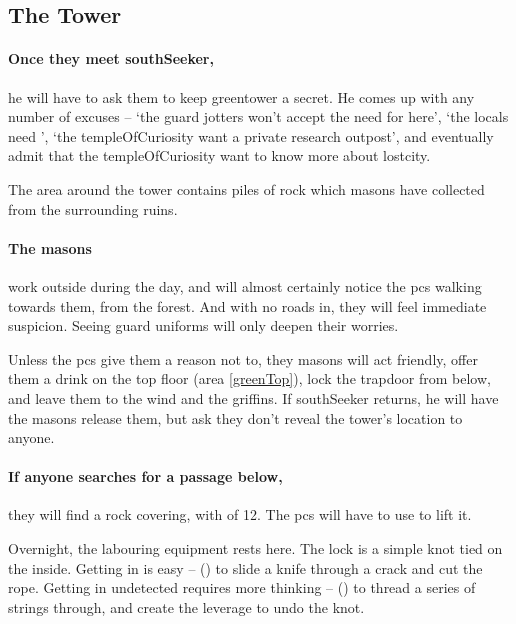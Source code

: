 \begin{multicols}{2}
\subsection{The Tower}

\paragraph{Once they meet \gls{southSeeker},}
he will have to ask them to keep \gls{greentower} a secret.
He comes up with any number of excuses -- `the \gls{guard} \glspl{jotter} won't accept the need for  here', `the locals need ', `the \gls{templeOfCuriosity} want a private research outpost', and eventually admit that the \gls{templeOfCuriosity} want to know more about \gls{lostcity}.


The area around the tower contains piles of rock which masons have collected from the surrounding ruins.

\paragraph{The masons}
work outside during the day, and will almost certainly notice the \glspl{pc} walking towards them, from the forest.
And with no roads in, they will feel immediate suspicion.
Seeing \gls{guard} uniforms will only deepen their worries.

Unless the \glspl{pc} give them a reason not to, they masons will act friendly, offer them a drink on the top floor (area \ref{greenTop}), lock the trapdoor from below, and leave them to the wind and the griffins.
If \gls{southSeeker} returns, he will have the masons release them, but ask they don't reveal the tower's location to anyone.


\boxPair[t]{
  \southSeeker

}{
  \showStdSpells
}

\paragraph{If anyone searches for a passage below,}
they will find a rock covering, with  of 12.
The \glspl{pc} will have to use  to lift it.


Overnight, the labouring equipment rests here.
The lock is a simple knot tied on the inside.
Getting in is easy --  (\tn[6]) to slide a knife through a crack and cut the rope.
Getting in undetected requires more thinking --  (\tn[14]) to thread a series of strings through, and create the leverage to undo the knot.


\end{multicols}
